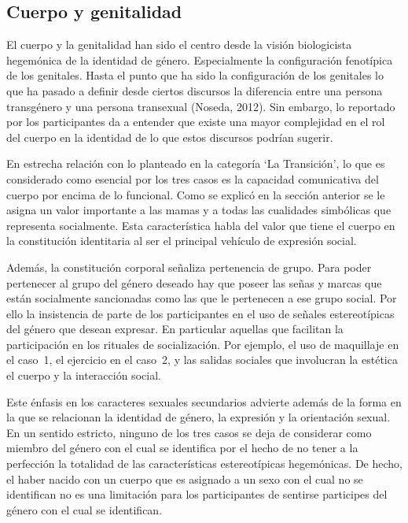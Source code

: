 \subsection{Cuerpo y genitalidad}

El cuerpo y la genitalidad han sido el centro desde la visión biologicista
hegemónica de la identidad de género. Especialmente la configuración fenotípica
de los genitales. Hasta el punto que ha sido la configuración de los genitales
lo que ha pasado a definir desde ciertos discursos la diferencia entre una
persona transgénero y una persona transexual (Noseda, 2012). Sin embargo, lo
reportado por los participantes da a entender que existe una mayor complejidad
en el rol del cuerpo en la identidad de lo que estos discursos podrían sugerir.

En estrecha relación con lo planteado en la categoría ‘La Transición’, lo que es
considerado como esencial por los tres casos es la capacidad comunicativa del
cuerpo por encima de lo funcional. Como se explicó en la sección anterior se le
asigna un valor importante a las mamas y a todas las cualidades simbólicas que
representa socialmente. Esta característica habla del valor que tiene el cuerpo
en la constitución identitaria al ser el principal vehículo de expresión social.

Además, la constitución corporal señaliza pertenencia de grupo. Para poder
pertenecer al grupo del género deseado hay que poseer las señas y marcas que
están socialmente sancionadas como las que le pertenecen a ese grupo social. Por
ello la insistencia de parte de los participantes en el uso de señales
estereotípicas del género que desean expresar. En particular aquellas que
facilitan la participación en los rituales de socialización. Por ejemplo, el uso
de maquillaje en el caso~1, el ejercicio en el caso~2, y las salidas sociales
que involucran la estética el cuerpo y la interacción social.

Este énfasis en los caracteres sexuales secundarios advierte además de la forma
en la que se relacionan la identidad de género, la expresión y la orientación
sexual. En un sentido estricto, ninguno de los tres casos se deja de considerar
como miembro del género con el cual se identifica por el hecho de no tener a la
perfección la totalidad de las características estereotípicas hegemónicas. De
hecho, el haber nacido con un cuerpo que es asignado a un sexo con el cual no se
identifican no es una limitación para los participantes de sentirse participes
del género con el cual se identifican.

